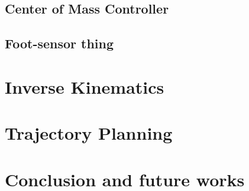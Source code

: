 \documentclass{beamer}
\begin{document}
\subsection{Center of Mass Controller}


\subsection{Foot-sensor thing}

\section{Inverse Kinematics}

\section{Trajectory Planning}


\section{Conclusion and future works}
\end{document}
